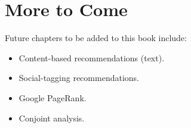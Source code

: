 \chapter{More to Come}  
\label{chap:more}  

Future chapters to be added to this book include:

\begin{itemize}

\item Content-based recommendations (text).

\item Social-tagging recommendations.

\item Google PageRank.

\item Conjoint analysis.

\end{itemize} 

